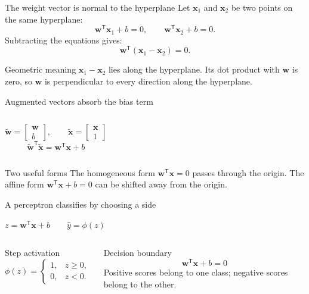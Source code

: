\documentclass[aspectratio=169,11pt]{beamer}
\newcommand{\keyeq}[1]{%
  \begin{center}
  \setlength{\fboxsep}{9pt}%
  {\color{navy}$\displaystyle #1$}
  \end{center}}
\begin{document}
\begin{frame}{The weight vector is normal to the hyperplane}
Let $\bm x_1$ and $\bm x_2$ be two points on the same hyperplane:
\[
\bm w^{\mathsf T}\bm x_1+b=0,
\qquad
\bm w^{\mathsf T}\bm x_2+b=0.
\]
Subtracting the equations gives:
\[
\bm w^{\mathsf T}(\bm x_1-\bm x_2)=0.
\]
\begin{exampleblock}{Geometric meaning}
$\bm x_1-\bm x_2$ lies along the hyperplane. Its dot product with $\bm w$ is zero, so $\bm w$ is perpendicular to every direction along the hyperplane.
\end{exampleblock}
\end{frame}

\begin{frame}{Augmented vectors absorb the bias term}
\begin{columns}[T,onlytextwidth]
\[
\widetilde{\bm w}=
\begin{bmatrix}\bm w\\b\end{bmatrix},
\qquad
\widetilde{\bm x}=
\begin{bmatrix}\bm x\\1\end{bmatrix}
\]
\[
\widetilde{\bm w}^{\mathsf T}\widetilde{\bm x}
=\bm w^{\mathsf T}\bm x+b
\]
\end{columns}
\vspace{0.45cm}
\begin{block}{Two useful forms}
The homogeneous form $\bm w^{\mathsf T}\bm x=0$ passes through the origin. The affine form $\bm w^{\mathsf T}\bm x+b=0$ can be shifted away from the origin.
\end{block}
\end{frame}

\begin{frame}{A perceptron classifies by choosing a side}
\keyeq{z=\bm w^{\mathsf T}\bm x+b\qquad\hat y=\phi(z)}
\begin{columns}[T,onlytextwidth]
\begin{block}{Step activation}
\[
\phi(z)=
\begin{cases}
1,&z\ge 0,\\
0,&z<0.
\end{cases}
\]
\end{block}
\begin{exampleblock}{Decision boundary}
\[
\bm w^{\mathsf T}\bm x+b=0
\]
Positive scores belong to one class; negative scores belong to the other.
\end{exampleblock}
\end{columns}
\end{frame}
\end{document}
